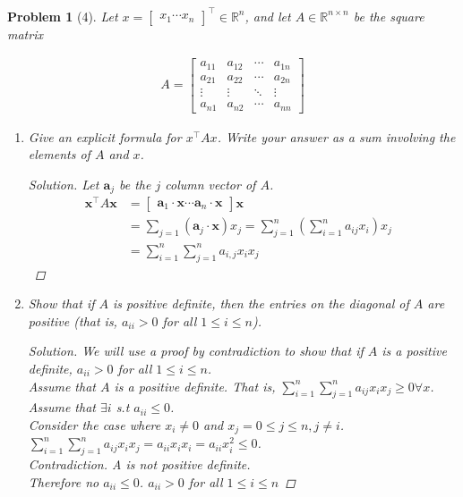 \documentclass[11pt]{article}
\theoremstyle{quest}
\newtheorem*{problem}{Problem}
\newenvironment{solution}
  {\begin{mdframed}\begin{proof}[Solution]}
  {\end{proof}\end{mdframed}}
\begin{document}
\begin{problem}[4]
Let $x = \begin{bmatrix}x_1 \cdots x_n\end{bmatrix}^\intercal \in \mathbb{R}^{n}$, and let $A \in \mathbb{R}^{n \times n}$ be the square matrix

\begin{align*}
A =
 \begin{bmatrix}
  a_{11} & a_{12} & \cdots & a_{1n} \\
  a_{21} & a_{22} & \cdots & a_{2n} \\
  \vdots  & \vdots  & \ddots & \vdots  \\
  a_{n1} & a_{n2} & \cdots & a_{nn}
 \end{bmatrix}
\end{align*}
    \begin{enumerate}[label=(\alph*)]
    \item Give an explicit formula for $x^\intercal A x$. Write your answer as a sum involving the elements of $A$ and $x$.
        \begin{solution}
        Let $\mathbf{a}_j$ be the $j$ column vector of $A$.
        \begin{align*}
            \mathbf{x}^\intercal A \mathbf{x} &= \begin{bmatrix}\mathbf{a}_1 \cdot \mathbf{x} \cdots \mathbf{a}_n \cdot \mathbf{x} \end{bmatrix} \mathbf{x} &\\
             &= \sum_{j=1} (\mathbf{a}_j \cdot \mathbf{x}) x_j  = \sum_{j=1}^n (\sum_{i=1}^{n} a_{i j} x_i) x_j &\\
             &= \sum_{i=1}^{n} \sum_{j=1}^{n} a_{i,j} x_i x_j
        \end{align*}
        \end{solution}
    \item  Show that if $A$ is positive definite, then the entries on the diagonal of $A$ are positive
(that is, $a_{ii} > 0$ for all $1\leq i\leq n$).
        \begin{solution}
                We will use a proof by contradiction to show that if $A$ is a positive definite, $a_{ii} > 0$ for all $1\leq i\leq n$. \\
                Assume that $A$ is a positive definite. That is, $\sum_{i=1}^{n} \sum_{j=1}^{n} a_{ij} x_i x_j \geq 0 \forall x$. Assume that $\exists i$ s.t $a_{ii} \leq 0$. \\
                Consider the case where $x_i \neq 0$ and $x_{j} = 0 \leq j \leq n, j \neq i$. $\sum_{i=1}^{n} \sum_{j=1}^{n} a_{ij} x_i x_j = a_{ii} x_i x_i = a_{ii} x_i^2 \leq 0$. \\
                Contradiction. A is not positive definite. \\
                Therefore no $a_{ii} \leq 0$. $a_{ii} > 0$ for all $1\leq i\leq n$
        \end{solution}
    \end{enumerate}
\end{problem}
\end{document}
